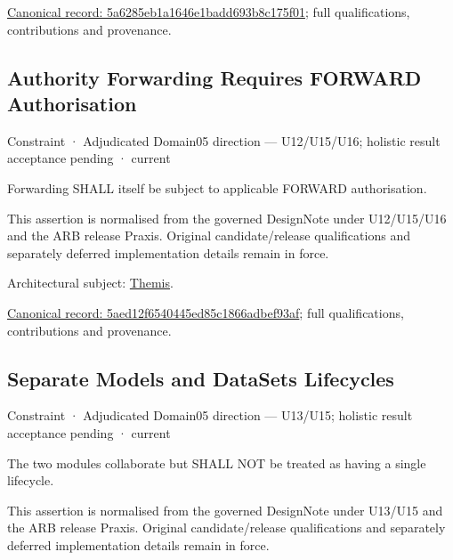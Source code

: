 {\footnotesize \href{../../../../continuum/motivation/constraint/5a6285eb1a1646e1badd693b8c175f01.md}{Canonical record: 5a6285eb1a1646e1badd693b8c175f01}; full qualifications, contributions and provenance.}\par
\subsection{Authority Forwarding Requires FORWARD Authorisation}

\label{element:5aed12f6540445ed85c1866adbef93af}
{\small Constraint · Adjudicated Domain05 direction — U12/U15/U16; holistic result acceptance pending · current}\par

Forwarding SHALL itself be subject to applicable FORWARD authorisation.



This assertion is normalised from the governed DesignNote under U12/U15/U16 and the ARB release Praxis. Original candidate/release qualifications and separately deferred implementation details remain in force.



Architectural subject: \hyperref[element:899d34ec491948b68aad09e507dea6d1]{Themis}.


{\footnotesize \href{../../../../continuum/motivation/constraint/5aed12f6540445ed85c1866adbef93af.md}{Canonical record: 5aed12f6540445ed85c1866adbef93af}; full qualifications, contributions and provenance.}\par
\subsection{Separate Models and DataSets Lifecycles}

\label{element:5c15fa0761da496b8194f3a6f742ecb5}
{\small Constraint · Adjudicated Domain05 direction — U13/U15; holistic result acceptance pending · current}\par

The two modules collaborate but SHALL NOT be treated as having a single
lifecycle.



This assertion is normalised from the governed DesignNote under U13/U15 and the ARB release Praxis. Original candidate/release qualifications and separately deferred implementation details remain in force.



